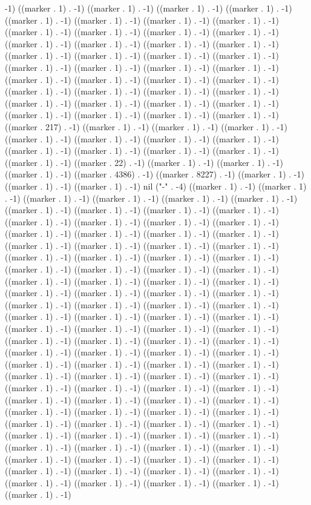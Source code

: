 -1) ((marker . 1) . -1) ((marker . 1) . -1) ((marker . 1) . -1) ((marker . 1) . -1) ((marker . 1) . -1) ((marker . 1) . -1) ((marker . 1) . -1) ((marker . 1) . -1) ((marker . 1) . -1) ((marker . 1) . -1) ((marker . 1) . -1) ((marker . 1) . -1) ((marker . 1) . -1) ((marker . 1) . -1) ((marker . 1) . -1) ((marker . 1) . -1) ((marker . 1) . -1) ((marker . 1) . -1) ((marker . 1) . -1) ((marker . 1) . -1) ((marker . 1) . -1) ((marker . 1) . -1) ((marker . 1) . -1) ((marker . 1) . -1) ((marker . 1) . -1) ((marker . 1) . -1) ((marker . 1) . -1) ((marker . 1) . -1) ((marker . 1) . -1) ((marker . 1) . -1) ((marker . 1) . -1) ((marker . 1) . -1) ((marker . 1) . -1) ((marker . 1) . -1) ((marker . 1) . -1) ((marker . 1) . -1) ((marker . 1) . -1) ((marker . 1) . -1) ((marker . 1) . -1) ((marker . 1) . -1) ((marker . 217) . -1) ((marker . 1) . -1) ((marker . 1) . -1) ((marker . 1) . -1) ((marker . 1) . -1) ((marker . 1) . -1) ((marker . 1) . -1) ((marker . 1) . -1) ((marker . 1) . -1) ((marker . 1) . -1) ((marker . 1) . -1) ((marker . 1) . -1) ((marker . 1) . -1) ((marker . 22) . -1) ((marker . 1) . -1) ((marker . 1) . -1) ((marker . 1) . -1) ((marker . 4386) . -1) ((marker . 8227) . -1) ((marker . 1) . -1) ((marker . 1) . -1) ((marker . 1) . -1) nil ("-" . -4) ((marker . 1) . -1) ((marker . 1) . -1) ((marker . 1) . -1) ((marker . 1) . -1) ((marker . 1) . -1) ((marker . 1) . -1) ((marker . 1) . -1) ((marker . 1) . -1) ((marker . 1) . -1) ((marker . 1) . -1) ((marker . 1) . -1) ((marker . 1) . -1) ((marker . 1) . -1) ((marker . 1) . -1) ((marker . 1) . -1) ((marker . 1) . -1) ((marker . 1) . -1) ((marker . 1) . -1) ((marker . 1) . -1) ((marker . 1) . -1) ((marker . 1) . -1) ((marker . 1) . -1) ((marker . 1) . -1) ((marker . 1) . -1) ((marker . 1) . -1) ((marker . 1) . -1) ((marker . 1) . -1) ((marker . 1) . -1) ((marker . 1) . -1) ((marker . 1) . -1) ((marker . 1) . -1) ((marker . 1) . -1) ((marker . 1) . -1) ((marker . 1) . -1) ((marker . 1) . -1) ((marker . 1) . -1) ((marker . 1) . -1) ((marker . 1) . -1) ((marker . 1) . -1) ((marker . 1) . -1) ((marker . 1) . -1) ((marker . 1) . -1) ((marker . 1) . -1) ((marker . 1) . -1) ((marker . 1) . -1) ((marker . 1) . -1) ((marker . 1) . -1) ((marker . 1) . -1) ((marker . 1) . -1) ((marker . 1) . -1) ((marker . 1) . -1) ((marker . 1) . -1) ((marker . 1) . -1) ((marker . 1) . -1) ((marker . 1) . -1) ((marker . 1) . -1) ((marker . 1) . -1) ((marker . 1) . -1) ((marker . 1) . -1) ((marker . 1) . -1) ((marker . 1) . -1) ((marker . 1) . -1) ((marker . 1) . -1) ((marker . 1) . -1) ((marker . 1) . -1) ((marker . 1) . -1) ((marker . 1) . -1) ((marker . 1) . -1) ((marker . 1) . -1) ((marker . 1) . -1) ((marker . 1) . -1) ((marker . 1) . -1) ((marker . 1) . -1) ((marker . 1) . -1) ((marker . 1) . -1) ((marker . 1) . -1) ((marker . 1) . -1) ((marker . 1) . -1) ((marker . 1) . -1) ((marker . 1) . -1) ((marker . 1) . -1) ((marker . 1) . -1) ((marker . 1) . -1) ((marker . 1) . -1) ((marker . 1) . -1) ((marker . 1) . -1) ((marker . 1) . -1) ((marker . 1) . -1) ((marker . 1) . -1) ((marker . 1) . -1) ((marker . 1) . -1) ((marker . 1) . -1) ((marker . 1) . -1) ((marker . 1) . -1) ((marker . 1) . -1) ((marker . 1) . -1) ((marker . 1) . -1) ((marker . 1) . -1) ((marker . 1) . -1) ((marker . 1) . -1) ((marker . 1) . -1) ((marker . 1) . -1) ((marker . 1) . -1) 